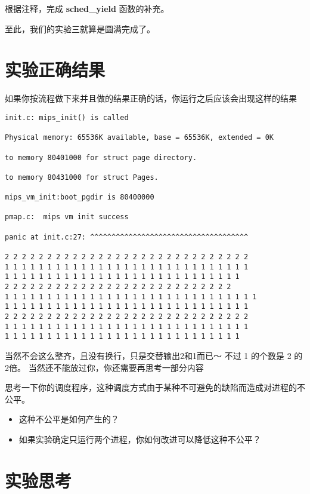 \begin{exercise}
根据注释，完成 \textbf{sched\_yield }函数的补充。
\end{exercise}

至此，我们的实验三就算是圆满完成了。

\section{实验正确结果}
如果你按流程做下来并且做的结果正确的话，你运行之后应该会出现这样的结果

\begin{verbatim}
init.c: mips_init() is called

Physical memory: 65536K available, base = 65536K, extended = 0K

to memory 80401000 for struct page directory.

to memory 80431000 for struct Pages.

mips_vm_init:boot_pgdir is 80400000

pmap.c:  mips vm init success

panic at init.c:27: ^^^^^^^^^^^^^^^^^^^^^^^^^^^^^^^^^^^^^

2 2 2 2 2 2 2 2 2 2 2 2 2 2 2 2 2 2 2 2 2 2 2 2 2 2 2 2 2 
1 1 1 1 1 1 1 1 1 1 1 1 1 1 1 1 1 1 1 1 1 1 1 1 1 1 1 1 1
1 1 1 1 1 1 1 1 1 1 1 1 1 1 1 1 1 1 1 1 1 1 1 1 1 1 1 1
2 2 2 2 2 2 2 2 2 2 2 2 2 2 2 2 2 2 2 2 2 2 2 2 2 2 2 
1 1 1 1 1 1 1 1 1 1 1 1 1 1 1 1 1 1 1 1 1 1 1 1 1 1 1 1 1 1 
1 1 1 1 1 1 1 1 1 1 1 1 1 1 1 1 1 1 1 1 1 1 1 1 1 1 1 1 1
2 2 2 2 2 2 2 2 2 2 2 2 2 2 2 2 2 2 2 2 2 2 2 2 2 2 2 2 2 
1 1 1 1 1 1 1 1 1 1 1 1 1 1 1 1 1 1 1 1 1 1 1 1 1 1 1 1 1 
1 1 1 1 1 1 1 1 1 1 1 1 1 1 1 1 1 1 1 1 1 1 1 1 1 1 1 1
\end{verbatim}

当然不会这么整齐，且没有换行，只是交替输出2和1而已～ 不过 1 的个数是 2 的 2倍。 当然还不能放过你，你还需要再思考一部分内容

\begin{thinking}\label{think-调度}
思考一下你的调度程序，这种调度方式由于某种不可避免的缺陷而造成对进程的不公平。
  \begin{itemize}
    \item 这种不公平是如何产生的？
    \item 如果实验确定只运行两个进程，你如何改进可以降低这种不公平？
  \end{itemize}
\end{thinking}

\section{实验思考}

